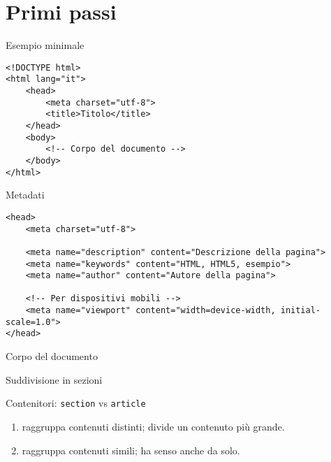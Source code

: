 \section{Primi passi}

\begin{frame}[fragile]{Esempio minimale}\transfade\centering
  \begin{verbatim}
<!DOCTYPE html>
<html lang="it">
    <head>
        <meta charset="utf-8">
        <title>Titolo</title>
    </head>
    <body>
        <!-- Corpo del documento -->
    </body>
</html>
  \end{verbatim}
\end{frame}

\begin{frame}[fragile]{Metadati}\transfade\centering
  \begin{verbatim}
<head>
    <meta charset="utf-8">

    <meta name="description" content="Descrizione della pagina">
    <meta name="keywords" content="HTML, HTML5, esempio">
    <meta name="author" content="Autore della pagina">

    <!-- Per dispositivi mobili -->
    <meta name="viewport" content="width=device-width, initial-scale=1.0">
</head>
  \end{verbatim}
\end{frame}

\begin{frame}[fragile]{Corpo del documento}\transfade\centering
\end{frame}

\begin{frame}[fragile]{Suddivisione in sezioni}\transfade\centering
\end{frame}

\begin{frame}{Contenitori: \texttt{section} vs \texttt{article}}\transfade\centering
  \begin{enumerate}[<+->]
    \item {} raggruppa contenuti distinti; divide un contenuto più grande.
    \item {} raggruppa contenuti simili; ha senso anche da solo.
  \end{enumerate}
\end{frame}


